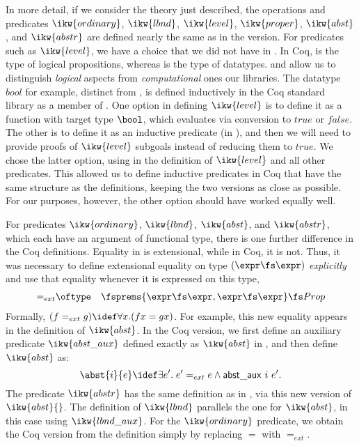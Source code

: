 \documentclass[final]{svjour3}
\begin{document}
In more detail, if we consider the \HOL theory just described, the
operations and predicates $\ikw{ordinary}$, $\ikw{lbnd}$,
$\ikw{level}$, $\ikw{proper}$, $\ikw{abst}$, and $\ikw{abstr}$
are defined nearly the same as in the \HOL version.
For predicates such as $\ikw{level}$, we have a choice that we did not
have in \HOL\@.  In Coq, \Prop is the type of logical propositions,
whereas \Set is the type of datatypes.
 \Prop and \Set allow us to distinguish \emph{logical} aspects from
\emph{computational} ones \wrt our libraries.  The datatype $bool$ for
example, distinct from \Prop, is defined inductively in the Coq
standard library as a member of \Set.  One option in defining
$\ikw{level}$ is to define it as a function with target type $\bool$,
which evaluates via conversion to $true$ or $false$.  The other is to
define it as an inductive predicate (in \Prop), and then we will need
to provide proofs of $\ikw{level}$ subgoals instead of reducing them to
$true$.  We chose the latter option, using \Prop in the definition of
$\ikw{level}$ and all other predicates.
This allowed us to define inductive predicates in Coq that have the
same structure as the \HOL definitions, keeping the two versions as
close as possible.  For our purposes, however, the other option
should have worked equally well.

For predicates $\ikw{ordinary}$, $\ikw{lbnd}$, $\ikw{abst}$,
and $\ikw{abstr}$, which each have an argument of functional type,
there is one further difference in the Coq definitions.  Equality in
\HOL is extensional, while in Coq, it is not.  Thus, it was necessary
to define extensional equality on type $(\expr \fs \expr)$
\emph{explicitly} and use that equality whenever it is expressed on
this type, \viz
\begin{eqnarray*}
=_{ext} &\oftype &\fsprems{\expr\fs\expr,\expr\fs\expr} \fs Prop
\end{eqnarray*}
Formally, $(f =_{ext} g) \idef \forall x.(f x = g x)$.  For example,
this new equality appears in the definition of $\ikw{abst}$.  In the Coq
version, we first define an auxiliary predicate $\ikw{abst\_aux}$
defined exactly as $\ikw{abst}$ in \HOL, and then define $\ikw{abst}$
as:
$$\abst{i}{e} \idef \exists e'.\; e'=_{ext}e\land
\mathsf{abst\_aux}~i~e'.$$ 
The predicate $\ikw{abstr}$ has the same definition as in \HOL, via this
new version of $\ikw{abst}{}$.  The definition of $\ikw{lbnd}$ parallels
the one for $\ikw{abst}$, in this case using $\ikw{lbnd\_aux}$.  For
the $\ikw{ordinary}$ predicate, we obtain the Coq version from the \HOL
definition simply by replacing $=$ with $=_{ext}$.
\end{document}
